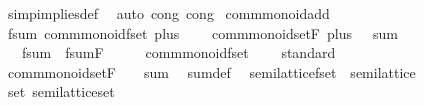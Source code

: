 \begin{isabellebody}
%
\isadelimproof
%
\endisadelimproof
%
\isatagproof
{}\isamarkupfalse%
\ simp{\isacharunderscore}implies{\isacharunderscore}def\ \isamarkupfalse%
\ {\isacharparenleft}auto\ cong{\isacharcolon}\ cong{\isacharparenright}%
\endisatagproof
{\isafoldproof}%
%
\isadelimproof
\isanewline
%
\endisadelimproof
\isanewline
{}\isamarkupfalse%
\isanewline
\isanewline
{}\isamarkupfalse%
\ comm{\isacharunderscore}monoid{\isacharunderscore}add\ \isanewline
\isanewline
{}\isamarkupfalse%
\ fsum{\isacharcolon}\ comm{\isacharunderscore}monoid{\isacharunderscore}fset\ plus\ {}\isanewline
\ \ \ {\isachardoublequoteopen}comm{\isacharunderscore}monoid{\isacharunderscore}set{\isachardot}F\ plus\ {}\ {\isacharequal}\ sum{\isachardoublequoteclose}\isanewline
\ \ \ fsum\ {\isacharequal}\ fsum{\isachardot}F\isanewline
%
\isadelimproof
%
\endisadelimproof
%
\isatagproof
{}\isamarkupfalse%
\ {\isacharminus}\isanewline
\ \ \isamarkupfalse%
\ {\isachardoublequoteopen}comm{\isacharunderscore}monoid{\isacharunderscore}fset\ {\isacharparenleft}{\isacharplus}{\isacharparenright}\ {}{\isachardoublequoteclose}\ \isamarkupfalse%
\ standard\isanewline
\isanewline
\ \ \isamarkupfalse%
\ {\isachardoublequoteopen}comm{\isacharunderscore}monoid{\isacharunderscore}set{\isachardot}F\ {\isacharparenleft}{\isacharplus}{\isacharparenright}\ {}\ {\isacharequal}\ sum{\isachardoublequoteclose}\ \isamarkupfalse%
\ sum{\isacharunderscore}def\ \isacommand{{\isachardot}{\isachardot}}\isamarkupfalse%
\isanewline
{}\isamarkupfalse%
%
\endisatagproof
{\isafoldproof}%
%
\isadelimproof
\isanewline
%
\endisadelimproof
\isanewline
{}\isamarkupfalse%
%
\isadelimdocument
%
\endisadelimdocument
%
\isatagdocument
%
\isamarkuptrue%
%
\endisatagdocument
{\isafolddocument}%
%
\isadelimdocument
%
\endisadelimdocument
{}\isamarkupfalse%
\ semilattice{\isacharunderscore}fset\ {\isacharequal}\ semilattice\isanewline
{}\isanewline
\isanewline
{}\isamarkupfalse%
\ set{\isacharcolon}\ semilattice{\isacharunderscore}set%
\isadelimproof
\ %
\endisadelimproof
%
\isatagproof
\isacommand{{\isachardot}{\isachardot}}\isamarkupfalse%
%
\endisatagproof
{\isafoldproof}%
%
\isadelimproof
%
\endisadelimproof
\isanewline
\isanewline
{}\isamarkupfalse%

\end{isabellebody}
